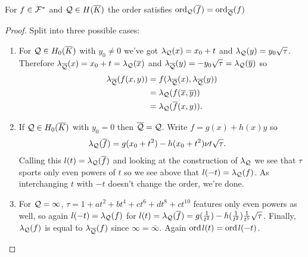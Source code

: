\documentclass[english,11pt,a4paper]{article}
\begin{document}
\begin{lemma}\label{three}
  For $f \in \mathcal{F}^*$ and $\mathcal{Q} \in H(\overline K)$ the order satisfies $\text{ord}_{\mathcal{Q}}(\overline f) = \text{ord}_{\overline {\mathcal{Q}}} (f)$
  \begin{proof} Split into three possible cases:
    \begin{enumerate}[1.]
    	\item For $\mathcal{Q} \in H_0(\overline K)$ with $y_0 \neq 0$ we've got $\lambda_{\mathcal{Q}}(x) = x_0 + t$ and $\lambda_{\mathcal{Q}}(y) = y_0 \sqrt \tau$. Therefore $\lambda_{\overline {\mathcal{Q}}}(x) = x_0 + t = \lambda_{\mathcal{Q}} (\overline x)$ and $\lambda_{\overline {\mathcal{Q}}}(y) = - y_0 \sqrt \tau = \lambda_{\mathcal{Q}} (\overline y)$ so
    	\begin{align*}
    	  \lambda_{\overline {\mathcal{Q}}} (f(x,y)) &= f(\lambda_{\overline {\mathcal{Q}}}(x) , \lambda_{\overline {\mathcal{Q}}}(y) ) \\
    	  							&= \lambda_{\mathcal{Q}} (f(\overline x, \overline y)) \\
    	  							&= \lambda_{\mathcal{Q}} (\overline f (x,y)).
    	\end{align*}

    	\item If $\mathcal{Q} \in H_0(\overline K)$ with $y_0 = 0$ then $\overline {\mathcal{Q}} = \mathcal{Q}$. Write $f = g(x) + h(x)y$ so
    	\begin{align*}
    	  \lambda_{\mathcal{Q}} (\overline f) &= g(x_0 + t^2) - h(x_0 + t^2) \nu t \sqrt{\tau}.
    	\end{align*}
    	Calling this $l(t) = \lambda_{\mathcal{Q}} (\overline f)$ and looking at the construction of $\lambda_{\mathcal{Q}}$ we see that $\tau$ sports only even powers of $t$ so we see above that $l(-t) = \lambda_{\mathcal{Q}} (f)$. As interchanging $t$ with $-t$ doesn't change the order, we're done.

    	\item For $\mathcal{Q} = \infty$, $\tau = 1 + a t^2 + b t^4 + c t^6 + d t^8 + c t^{10}$ features only even powers as well, so again $l(-t) = \lambda_{\mathcal{Q}} (f)$ for $l(t) = \lambda_{\mathcal{Q}} (\overline f) = g(\frac{1}{t^2}) - h(\frac{1}{t^2}) \frac{1}{t^5} \sqrt{\tau}$. Finally, $\lambda_{\mathcal{Q}} (f)$ is equal to $\lambda_{\overline {\mathcal{Q}}} (f)$ since $\infty = \bar \infty$. Again $\text{ord\hspace{0.4mm}} l(t) = \text{ord\hspace{0.4mm}} l(-t)$.
    \end{enumerate}
  \end{proof}
\end{lemma}
\end{document}
